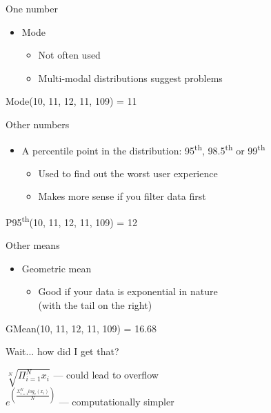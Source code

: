 \documentclass{beamer}
\begin{document}
\begin{frame}{One number}
  \begin{itemize}
  \item Mode
    \begin{itemize}
    \item Not often used
    \item Multi-modal distributions suggest problems
    \end{itemize}
  \end{itemize}
  \begin{center}
  \Large{ Mode(10, 11, 12, 11, 109) = 11 }
  \end{center}
\end{frame}

\begin{frame}{Other numbers}
  \begin{itemize}
  \item A percentile point in the distribution: 95\textsuperscript{th}, 98.5\textsuperscript{th} or 99\textsuperscript{th}
    \begin{itemize}
    \item Used to find out the worst user experience
    \item Makes more sense if you filter data first
    \end{itemize}
  \end{itemize}
  \begin{center}
  \Large{ P95\textsuperscript{th}(10, 11, 12, 11, 109) = 12 }
  \end{center}
\end{frame}

\begin{frame}{Other means}
  \begin{itemize}
  \item Geometric mean
    \begin{itemize}
    \item Good if your data is exponential in nature \\ (with the tail on the right)
    \end{itemize}
  \end{itemize}
  \begin{center}
  \Large{ GMean(10, 11, 12, 11, 109) = 16.68 }
  \end{center}
\end{frame}

\begin{frame}{Wait... how did I get that?}
  \pause

  \begin{center}
  \Large{\( \sqrt[N]{\Pi^N_{i=1}x_i} \)}
  \pause
  --- could lead to overflow \\
  \medskip
  \pause
  \medskip
  \Large{ \( e^{ \left(\frac{\Sigma^N_{i=1} log_e(x_i)}{N}\right) } \)} 
  --- computationally simpler
  \end{center}
\end{frame}
\end{document}
